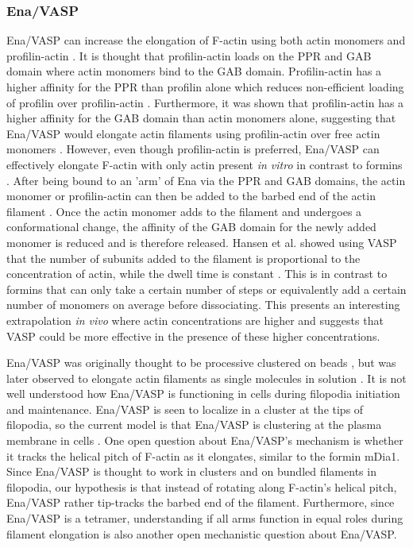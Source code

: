 \subsubsection{Ena/VASP}
Ena/VASP can increase the elongation of F-actin using both actin monomers and profilin-actin \citep{kang_profilin_1997,hansen_vasp_2010, winkelman_ena/vasp_2014}. It is thought that profilin-actin loads on the PPR and GAB domain where actin monomers bind to the GAB domain. Profilin-actin has a higher affinity for the PPR than profilin alone which reduces non-efficient loading of profilin over profilin-actin \citep{ferron_structural_2007}. Furthermore, it was shown that profilin-actin has a higher affinity for the GAB domain than actin monomers alone, suggesting that Ena/VASP would elongate actin filaments using profilin-actin over free actin monomers \citep{chereau_understanding_2006}. However, even though profilin-actin is preferred, Ena/VASP can effectively elongate F-actin with only actin present \textit{in vitro} in contrast to formins \citep{hansen_vasp_2010,winkelman_ena/vasp_2014}. After being bound to an 'arm' of Ena via the PPR and GAB domains, the actin monomer or profilin-actin can then be added to the barbed end of the actin filament \citep{chereau_understanding_2006, ferron_structural_2007, breitsprecher_molecular_2011}. Once the actin monomer adds to the filament and undergoes a conformational change, the affinity of the GAB domain for the newly added monomer is reduced and is therefore released. Hansen et al. showed using VASP that the number of subunits added to the filament is proportional to the concentration of actin, while the dwell time is constant \citep{hansen_vasp_2010}. This is in contrast to formins that can only take a certain number of steps or equivalently add a certain number of monomers on average before dissociating. This presents an interesting extrapolation \textit{in vivo} where actin concentrations are higher and suggests that VASP could be more effective in the presence of these higher concentrations.  

Ena/VASP was originally thought to be processive clustered on beads \citep{breitsprecher_clustering_2008}, but was later observed to elongate actin filaments as single molecules in solution \citep{hansen_vasp_2010,winkelman_ena/vasp_2014, breitsprecher_molecular_2011}. It is not well understood how Ena/VASP is functioning in cells during filopodia initiation and maintenance. Ena/VASP is seen to localize in a cluster at the tips of filopodia, so the current model is that Ena/VASP is clustering at the plasma membrane in cells \citep{svitkina_mechanism_2003,lanier_mena_1999}. One open question about Ena/VASP's mechanism is whether it tracks the helical pitch of F-actin as it elongates, similar to the formin mDia1. Since Ena/VASP is thought to work in clusters and on bundled filaments in filopodia, our hypothesis is that instead of rotating along F-actin's helical pitch, Ena/VASP rather tip-tracks the barbed end of the filament. Furthermore, since Ena/VASP is a tetramer, understanding if all arms function in equal roles during filament elongation is also another open mechanistic question about Ena/VASP. 

